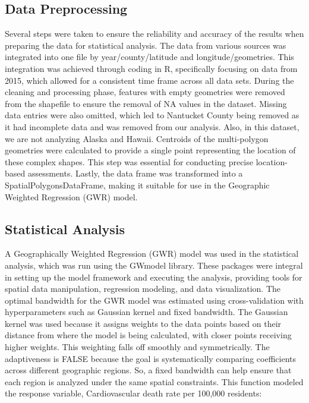 \documentclass[
]{article}
\begin{document}
\subsection{Data Preprocessing}\label{data-preprocessing}

Several steps were taken to ensure the reliability and accuracy of the
results when preparing the data for statistical analysis. The data from
various sources was integrated into one file by year/county/latitude and
longitude/geometries. This integration was achieved through coding in R,
specifically focusing on data from 2015, which allowed for a consistent
time frame across all data sets. During the cleaning and processing
phase, features with empty geometries were removed from the shapefile to
ensure the removal of NA values in the dataset. Missing data entries
were also omitted, which led to Nantucket County being removed as it had
incomplete data and was removed from our analysis. Also, in this
dataset, we are not analyzing Alaska and Hawaii. Centroids of the
multi-polygon geometries were calculated to provide a single point
representing the location of these complex shapes. This step was
essential for conducting precise location-based assessments. Lastly, the
data frame was transformed into a SpatialPolygonsDataFrame, making it
suitable for use in the Geographic Weighted Regression (GWR) model.

\subsection{Statistical Analysis}\label{statistical-analysis}

A Geographically Weighted Regression (GWR) model was used in the
statistical analysis, which was run using the GWmodel library. These
packages were integral in setting up the model framework and executing
the analysis, providing tools for spatial data manipulation, regression
modeling, and data visualization. The optimal bandwidth for the GWR
model was estimated using cross-validation with hyperparameters such as
Gaussian kernel and fixed bandwidth. The Gaussian kernel was used
because it assigns weights to the data points based on their distance
from where the model is being calculated, with closer points receiving
higher weights. This weighting falls off smoothly and symmetrically. The
adaptiveness is FALSE because the goal is systematically comparing
coefficients across different geographic regions. So, a fixed bandwidth
can help ensure that each region is analyzed under the same spatial
constraints. This function modeled the response variable, Cardiovascular
death rate per 100,000 residents:
\end{document}
